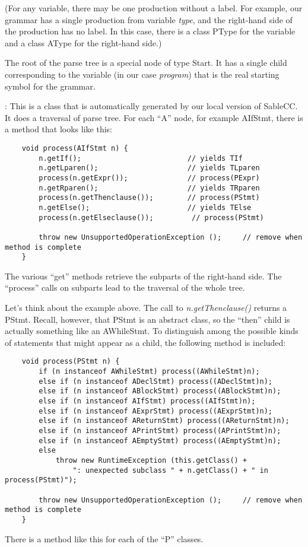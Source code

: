 \documentclass[11pt]{article}
\begin{document}
(For any variable, there may be one production without a label.  For example, our grammar has a single production from variable {\em type}, and the right-hand side of the production has no label.  In this case, there is a class PType for the variable and a class AType for the right-hand side.)

The root of the parse tree is a special node of type Start.  It has a single child corresponding to the variable (in our case {\em program}) that is the real starting symbol for the grammar.  

\mbox{}\par{}:  This is a class that is automatically generated by our local version of SableCC.  It does a traversal of parse tree.  For each ``A'' node, for example AIfStmt, there is a method that looks like this:
\begin{verbatim}
    void process(AIfStmt n) {
        n.getIf();                         // yields TIf
        n.getLparen();                     // yields TLparen
        process(n.getExpr());              // process(PExpr)
        n.getRparen();                     // yields TRparen
        process(n.getThenclause());        // process(PStmt)
        n.getElse();                       // yields TElse
        process(n.getElseclause());	        // process(PStmt)

        throw new UnsupportedOperationException ();     // remove when method is complete
    }
\end{verbatim}
The various ``get'' methods retrieve the subparts of the right-hand side.  The ``process'' calls on subparts lead to the traversal of the whole tree.

Let's think about the example above.  The call to {\em n.getThenclause()} returns a PStmt.  Recall, however, that PStmt is an abstract class, so the ``then'' child is actually something like an AWhileStmt.
To distinguish among the possible kinds of statements that might appear as a child, the following method is included:
\begin{verbatim}
    void process(PStmt n) {
        if (n instanceof AWhileStmt) process((AWhileStmt)n);
        else if (n instanceof ADeclStmt) process((ADeclStmt)n);
        else if (n instanceof ABlockStmt) process((ABlockStmt)n);
        else if (n instanceof AIfStmt) process((AIfStmt)n);
        else if (n instanceof AExprStmt) process((AExprStmt)n);
        else if (n instanceof AReturnStmt) process((AReturnStmt)n);
        else if (n instanceof APrintStmt) process((APrintStmt)n);
        else if (n instanceof AEmptyStmt) process((AEmptyStmt)n);
        else 
            throw new RuntimeException (this.getClass() + 
                ": unexpected subclass " + n.getClass() + " in process(PStmt)");

        throw new UnsupportedOperationException ();     // remove when method is complete
    }
\end{verbatim}
There is a method like this for each of the ``P'' classes.
\end{document}

